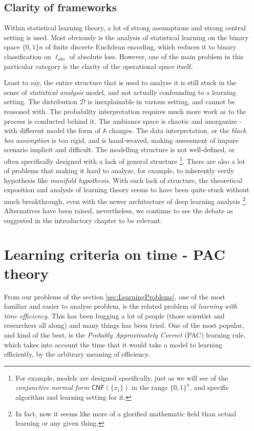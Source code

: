 \subsection{Clarity of frameworks}

Within statistical learning theory, a lot of strong assumptions and strong central setting is used. Most obviously is the analysis of statistical learning on the binary space $\{0,1\}{n}$ of finite discrete Euclidean encoding, which reduces it to binary classification on $\ell_{abs}$ of absolute loss. However, one of the main problem in this particular category is the clarity of the operational space itself. 

Least to say, the entire structure that is used to analyse it is still stuck in the sense of \textit{statistical analysis} model, and not actually confounding to a learning setting. The distribution $\mathcal{D}$ is inexplainable in various setting, and cannot be reasoned with. The probability interpretation requires much more work as to the process is conducted behind it. The ambiance space is chaotic and unorganize - with different model the form of $\mathbb{A}$ changes. The data interpretation, or the \textit{black box assumption} is too rigid, and is hand-weaved, making assessment of impure scenario implicit and difficult. The modelling structure is not well-defined, or often specifically designed with a lack of general structure \footnote{For example, models are designed specifically, just as we will see of the \textit{conjunctive normal form} $\mathsf{CNF}(\{x_{i}\})$ in the range $\{0,1\}^{n}$, and specific algorithm and learning setting for it.}. There are also a lot of problems that making it hard to analyze, for example, to inherently verify hypothesis like \textit{manifold hypothesis}. With such lack of structure, the theoretical exposition and analysis of learning theory seems to have been quite stuck without much breakthrough, even with the newer architecture of deep learning analysis \footnote{In fact, now it seems like more of a glorified mathematic field than actual learning or any given thing.}. Alternatives have been raised, nevertheless, we continue to see the debate as suggested in the introductory chapter to be relevant. 

\section{Learning criteria on time - PAC theory}

From our problems of the section \ref{sec:LearningProblems}, one of the most familiar and easier to analyse problem, is the related problem of \textit{learning with time efficiency}. This has been bugging a lot of people (those scientist and researchers all along) and many things has been tried. One of the most popular, and kind of the best, is the \textit{Probably Approximately Correct} (PAC) learning rule, which takes into account the time that it would take a model to learning efficiently, by the arbitrary meaning of efficiency.  


